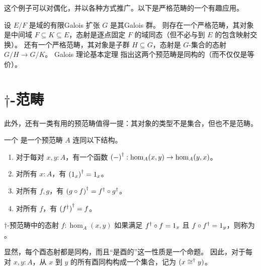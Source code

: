 这个例子可以对偶化，并以各种方式推广。以下是严格范畴的一个有趣应用。

\begin{eg}\label{ct:galois}
  设 $E/F$ 是域的有限Galois 扩张
  $G$ 是其Galois 群。
  则存在一个严格范畴，其对象是中间域 $F\subseteq K\subseteq E$，态射是逐点固定 $F$ 的域同态（但不必与到 $E$ 的包含映射交换）。
  还有一个严格范畴，其对象是子群 $H\subseteq G$，态射是 $G$-集合的态射 $G/H \to G/K$。
  Galois 理论基本定理
  指出这两个预范畴是同构的（而不仅仅是等价）。
\end{eg}

%

\section{\texorpdfstring{$\dagger$}{†}-范畴}
\label{sec:dagger-categories}

此外，还有一类有用的预范畴值得一提：其对象的类型不是集合，但也不是范畴。

\begin{defn}\label{ct:dagger-precategory}
  一个
  是一个预范畴 $A$ 连同以下结构。
  \begin{enumerate}
  \item 对于每对 $x,y:A$，有一个函数 ${(-)}^{\dagger}:\hom_A(x,y) \to \hom_A(y,x)$。
  \item 对所有 $x:A$，有 ${(1_x)}^{\dagger} = 1_x$。
  \item 对所有 $f,g$，有 ${(g\circ f)}^{\dagger} = {f}^{\dagger} \circ {g}^{\dagger}$。
  \item 对所有 $f$，有 ${({f}^{\dagger})}^{\dagger} = f$。
  \end{enumerate}
\end{defn}

\begin{defn}\label{ct:unitary}
  $\dagger$-预范畴中的态射 $f:\hom_A(x,y)$ 如果满足 ${f}^{\dagger} \circ f = 1_x$ 且 $f\circ {f}^{\dagger} = 1_y$，则称为
  。
\end{defn}

显然，每个酉态射都是同构，而且``是酉的''这一性质是一个命题。
因此，对于每对 $x,y:A$，从 $x$ 到 $y$ 的所有酉同构构成一个集合，记为 $(x\mathrel{\cong^\dagger} y)$。

